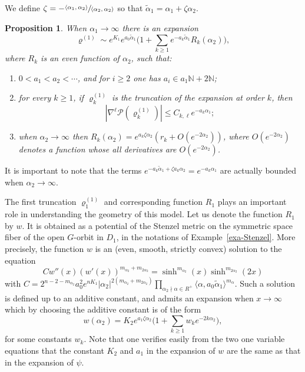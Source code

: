 \documentclass[10pt]{amsart}
\theoremstyle{plain}
\newtheorem{prop}[thm]{Proposition}
\theoremstyle{definition}
\newcommand{\ta}{\tilde \alpha}
\newcommand{\rRoots}{R}
\newcommand{\opP}{\mathcal{P}}
\newcommand{\rhoun}{\varrho^{(1)}}
\begin{document}
We define $\zeta=-\sfrac{\langle\alpha_1,\alpha_2\rangle}{\langle\alpha_2,\alpha_2\rangle}$ so that $\ta_1=\alpha_1+\zeta\alpha_2$.

\begin{prop}\label{prop:refin-model-near-1}
When $\alpha_1\to\infty$ there is an expansion
\begin{equation}
\rhoun \sim e^{K_1}e^{a_0\ta_1} \Big( 1 + \sum_{k\geq1} e^{-a_k\ta_1}R_k(\alpha_2) \Big),\label{eq:17}
\end{equation}
where $R_k$ is an even function of $\alpha_2$, such that:
\begin{enumerate}
\item $0<a_1<a_2<\cdots$, and for $i\geq2$ one has $a_i\in a_1\mathbb{N}+2\mathbb{N}$;
\item for every $k\geq1$, if $\rhoun_k$ is the truncation of the expansion at order $k$, then
\begin{equation}
|\nabla^\ell \opP(\rhoun_k)| \leq C_{k,\ell} e^{-a_k\alpha_1};\label{eq:23}
\end{equation}
\item when $\alpha_2\to\infty$ then $R_k(\alpha_2) = e^{a_k \zeta \alpha_2} (r_k + O(e^{-2\alpha_2}))$, where $O(e^{-2\alpha_2})$ denotes a function whose all derivatives are $O(e^{-2\alpha_2})$.
\end{enumerate}
\end{prop}

It is important to note that the terms $e^{-a_k\ta_1+\zeta a_k\alpha_2}=e^{-a_k\alpha_1}$ are actually bounded when $\alpha_2\to\infty$.

The first truncation $\rhoun_1$ and corresponding function $R_1$ plays an important
role in understanding the geometry of this model. Let us denote the function $R_1$ by $w$.
It is obtained as a potential of the Stenzel metric on the symmetric space fiber of the open $G$-orbit
in $D_1$, in the notations of Example~\ref{exa-Stenzel}.
More precisely, the function $w$ is an (even, smooth, strictly convex) solution to the equation
\[ Cw''(x)(w'(x))^{m_{\alpha_2}+m_{2\alpha_2}}=\sinh^{m_{\alpha_2}}(x)\sinh^{m_{2\alpha_2}}(2x) \]
with
$C=2^{n-2-m_{\alpha_2}}a_0^2e^{nK_1}|\alpha_2|^{2(m_{\alpha_2}+m_{2\alpha_2})}
\prod_{\alpha_2 \nmid \alpha\in\rRoots^+}\langle\alpha,a_0\ta_1\rangle^{m_{\alpha}}$.
Such a solution is defined up to an additive constant, and admits an expansion when $x\to \infty$
which by choosing the additive constant is of the form
\begin{equation}
w(\alpha_2) = K_2e^{a_1\zeta\alpha_2} \Big( 1 + \sum_{k\geq1} w_ke^{-2k\alpha_2} \Big),\label{eq:15}
\end{equation}
for some constants $w_k$.
Note that one verifies easily from the two one variable equations that the constant $K_2$ and $a_1$
in the expansion of $w$ are the same as that in the expansion of $\psi$.
\end{document}
